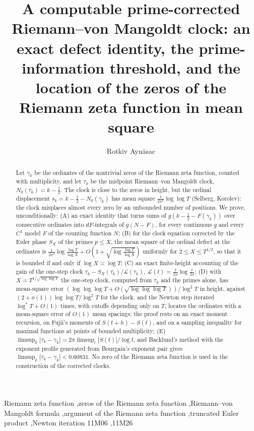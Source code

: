 \documentclass[preprint,12pt]{elsarticle}
\numberwithin{equation}{section}
\theoremstyle{plain}
\theoremstyle{definition}
\theoremstyle{remark}
\newcommand{\NO}{N_0}
\newcommand{\lL}{\mathcal L}
\begin{document}
\begin{frontmatter}
\title{A computable prime-corrected Riemann--von Mangoldt clock: an exact defect identity, the prime-information threshold, and the location of the zeros of the Riemann zeta function in mean square}
\author{Rotkiv Ayn\"asac}

\begin{abstract}
Let $\gamma_k$ be the ordinates of the nontrivial zeros of the Riemann zeta function, counted with multiplicity, and let $\tau_k$ be the midpoint Riemann--von Mangoldt clock, $\NO(\tau_k)=k-\frac12$. The clock is close to the zeros in height, but the ordinal displacement $s_k=k-\frac12-\NO(\gamma_k)$ has mean square $\frac1{2\pi^2}\log\log T$ (Selberg, Korolev): the clock misplaces almost every zero by an unbounded number of positions. We prove, unconditionally: (A) an exact identity that turns sums of $g(k-\frac12-F(\gamma_k))$ over consecutive ordinates into $dF$-integrals of $g(N-F)$, for every continuous $g$ and every $C^1$ model $F$ of the counting function $N$; (B) for the clock equation corrected by the Euler phase $S_X$ of the primes $p\le X$, the mean square of the ordinal defect at the ordinates is $\frac1{2\pi^2}\log\frac{\log T}{\log X}+O(1+\sqrt{\log\frac{\log T}{\log X}})$ uniformly for $2\le X\le T^{1/2}$, so that it is bounded if and only if $\log X\asymp\log T$; (C) an exact finite-height accounting of the gain of the one-step clock $\tau_k-S_X(\tau_k)/\lL(\tau_k)$, $\lL(t)=\frac1{2\pi}\log\frac t{2\pi}$; (D) with $X=T^{1/\sqrt{\log\log T}}$ the one-step clock, computed from $\tau_k$ and the primes alone, has mean-square error $(\log\log\log T+O(\sqrt{\log\log\log T}))/\log^2T$ in height, against $(2+o(1))\log\log T/\log^2T$ for the clock, and the Newton step iterated $\log^*T+O(1)$ times, with cutoffs depending only on $T$, locates the ordinates with a mean-square error of $O(1)$ mean spacings; the proof rests on an exact moment recursion, on Fujii's moments of $S(t+h)-S(t)$, and on a sampling inequality for maximal functions at points of bounded multiplicity; (E) $\limsup_k|\tau_k-\gamma_k|=2\pi\limsup_t|S(t)|/\log t$, and Backlund's method with the exponent profile generated from Bourgain's exponent pair gives $\limsup_k|\tau_k-\gamma_k|<0.60831$. No zero of the Riemann zeta function is used in the construction of the corrected clocks.
\end{abstract}

\begin{keyword}
Riemann zeta function \sep zeros of the Riemann zeta function \sep Riemann--von Mangoldt formula \sep argument of the Riemann zeta function \sep truncated Euler product \sep Newton iteration
\MSC[2020] 11M06 \sep 11M26
\end{keyword}
\end{frontmatter}
\end{document}
